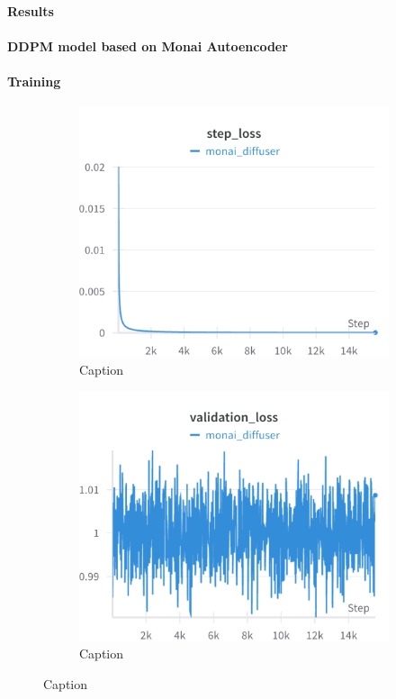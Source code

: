\paragraph{Results}


\paragraph{DDPM model based on Monai Autoencoder}

\paragraph{Training}
\begin{figure}[H]
\centering
\begin{subfigure}[h]{.45\linewidth}
    \includegraphics[width=\linewidth]{detailed_engineering/Monai Diffusion - Attempt 1/charts/step_loss.png}
    \caption{Caption}
    \label{fig:enter-label}
\end{subfigure}
\hfill
\begin{subfigure}[h]{.45\linewidth}
    \includegraphics[width=\linewidth]{detailed_engineering/Monai Diffusion - Attempt 1/charts/val_loss.png}
    \caption{Caption}
    \label{fig:enter-label}
\end{subfigure}
\end{figure}

